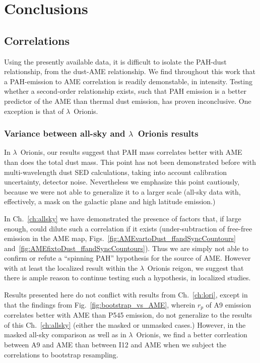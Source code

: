 \chapter{Conclusions}
  \label{ch:conclusions}

\section{Correlations }

  Using the presently available data, it is difficult to isolate the PAH-dust relationship, from the dust-AME relationship. We find throughout this work that a PAH-emission to AME correlation is readily demonstable, in intensity. Testing whether a second-order relationship exists, such that PAH emission is a better predictor of the AME than thermal dust emission, has proven inconclusive. One exception is that of $\lambda$~Orionis.

  \subsection{Variance between all-sky and $\lambda$~Orionis results}
      In $\lambda$~Orionis, our results suggest that PAH mass correlates better with AME than does the total dust mass. This point has not been demonstrated before with multi-wavelength dust SED calculations, taking into account calibration uncertainty, detector noise. Nevertheless we emphasize this point cautiously, because we were not able to generalize it to a larger scale (all-sky data with, effectively, a mask on the galactic plane and high latitude emission.)

      In Ch.~\ref{ch:allsky} we have demonstrated the presence of factors that, if large enough, could dilute such a correlation if it exists (under-subtraction of free-free emission in the AME map, Figs.~\ref{fig:AMEvartoDust_ffandSyncCountours} and~\ref{fig:AMEfixtoDust_ffandSyncCountours}). Thus we are simply not able to confirm or refute a ``spinning PAH'' hypothesis for the source of AME. However with at least the localized result within the $\lambda$~Orionis reigon, we suggest that there is ample reason to continue testing such a hypothesis, in localized studies.

      Results presented here do not conflict with results from Ch.~\ref{ch:lori}, except in that the findings from Fig.~\ref{fig:bootstrap_vs_AME}, wherein $r_{p}$ of A9 emission correlates better with AME than P545 emission, do not generalize to the results of this Ch.~\ref{ch:allsky} (either the masked or unmasked cases.) However, in the masked all-sky comparison as well as in $\lambda$~Orionis, we find a better corrleation between A9 and AME than between I12 and AME when we subject the correlations to bootstrap resampling.

